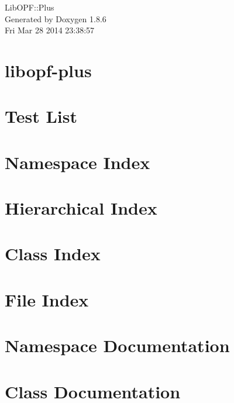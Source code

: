 \documentclass[twoside]{book}
\newcommand{\+}{\discretionary{\mbox{\scriptsize$\hookleftarrow$}}{}{}}
\newcommand{\clearemptydoublepage}{%
  \newpage{\pagestyle{empty}\cleardoublepage}%
}
\begin{document}
\hypersetup{pageanchor=false,
             bookmarks=true,
             bookmarksnumbered=true,
             pdfencoding=unicode
            }
\begin{titlepage}
\vspace*{7cm}
\begin{center}%
{\Large Lib\+O\+P\+F\+:\+:Plus }\\
\vspace*{1cm}
{\large Generated by Doxygen 1.8.6}\\
\vspace*{0.5cm}
{\small Fri Mar 28 2014 23:38:57}\\
\end{center}
\end{titlepage}
\clearemptydoublepage
\tableofcontents
\clearemptydoublepage
{}
\hypersetup{pageanchor=true}

\chapter{libopf-\/plus}
\label{md_README}
\hypertarget{md_README}{}

\chapter{Test List}
\label{test}
\hypertarget{test}{}

\chapter{Namespace Index}

\chapter{Hierarchical Index}

\chapter{Class Index}

\chapter{File Index}

\chapter{Namespace Documentation}

\chapter{Class Documentation}
















\end{document}
